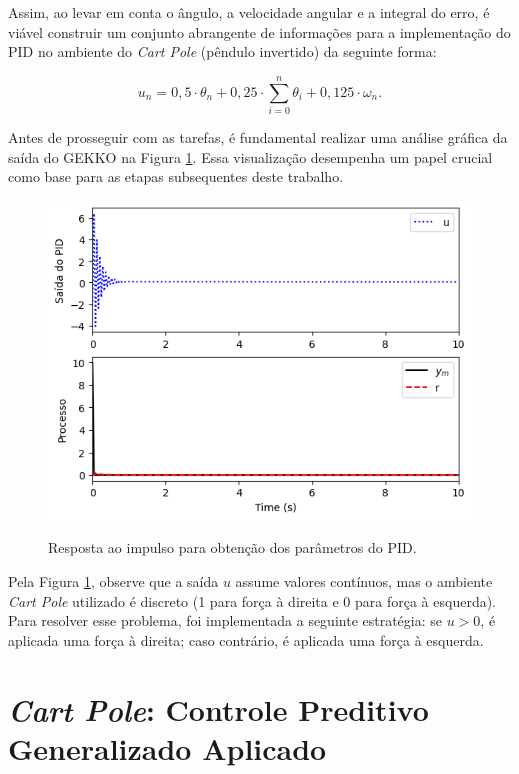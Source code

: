\documentclass[12pt,           %
a4paper,                       %
openany,                       %
oneside,                       %
chapter=TITLE,                 %
english,                       %
spanish,                       %
brazil,                        %
sumario=tradicional]{abntex2}  %
\begin{document}
\begin{OnehalfSpace}
Assim, ao levar em conta o ângulo, a velocidade angular e a integral do erro, é viável construir um conjunto abrangente de informações para a implementação do PID no ambiente do \textit{Cart Pole} (pêndulo invertido) da seguinte forma:

\begin{equation}
     u_n = 0,5 \cdot \theta_n + 0,25\cdot \sum_{i=0}^n \theta_i + 0,125 \cdot \omega_n.
    \label{eq:39}
\end{equation}

Antes de prosseguir com as tarefas, é fundamental realizar uma análise gráfica da saída do GEKKO na Figura \ref{fig:pid2024}. Essa visualização desempenha um papel crucial como base para as etapas subsequentes deste trabalho.

\begin{figure}[H]
     \centering
     \vspace*{-.2cm}
     \caption{Resposta ao impulso para obtenção dos parâmetros do PID.}
     \includegraphics[scale=.49]{pid.png}
     \label{fig:pid2024}
\end{figure}
\vspace*{-0.8cm}
{\raggedright {}}

Pela Figura \ref{fig:pid2024}, observe que a saída \(u\) assume valores contínuos, mas o ambiente \textit{Cart Pole} utilizado é discreto (1 para força à direita e 0 para força à esquerda). Para resolver esse problema, foi implementada a seguinte estratégia: se \(u > 0\), é aplicada uma força à direita; caso contrário, é aplicada uma força à esquerda.

\section{\textit{Cart Pole}: Controle Preditivo Generalizado Aplicado}
\label{sec:GPCcartpole}    


\end{OnehalfSpace}
\end{document}

